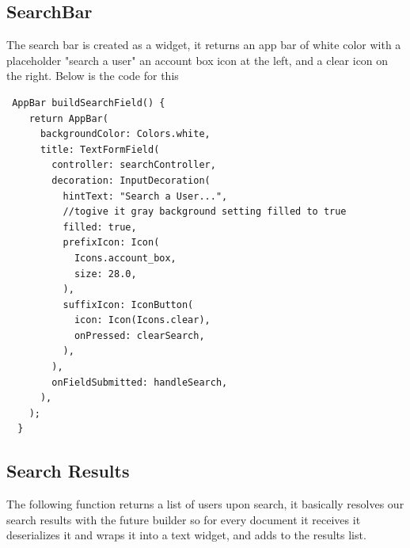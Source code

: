 \subsection{SearchBar}
The search bar is created as a widget, it returns an app bar of white color with a placeholder "search a user" an account box icon at the left, and a clear icon on the right. Below is the code for this 

\begin{verbatim}
 AppBar buildSearchField() {
    return AppBar(
      backgroundColor: Colors.white,
      title: TextFormField(
        controller: searchController,
        decoration: InputDecoration(
          hintText: "Search a User...",
          //togive it gray background setting filled to true
          filled: true,
          prefixIcon: Icon(
            Icons.account_box,
            size: 28.0,
          ),
          suffixIcon: IconButton(
            icon: Icon(Icons.clear),
            onPressed: clearSearch,
          ),
        ),
        onFieldSubmitted: handleSearch,
      ),
    );
  }
\end{verbatim}
\subsection{Search Results}
The following function returns a list of users upon search, it basically resolves our search results with the future builder so for every document it receives it deserializes it and wraps it into a text widget, and adds to the results list.

